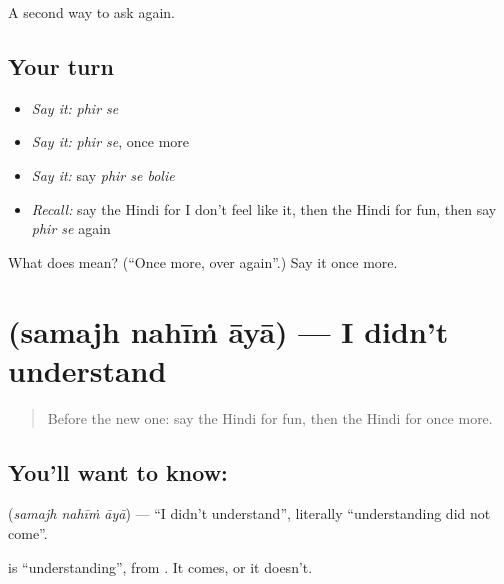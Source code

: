 \begin{grammarlens}[title={What you've built}]
A second way to ask again.
\end{grammarlens}

\subsection*{Your turn}
\begin{itemize}
\raggedright
  \item \emph{Say it:} \emph{phir se}
  \item \emph{Say it:} \emph{phir se}, once more
  \item \emph{Say it:} say \emph{phir se bolie}
  \item \emph{Recall:} say the Hindi for I don't feel like it, then the Hindi for fun, then say \emph{phir se} again
\end{itemize}

\begin{tcolorbox}[breakable,colback=teal!4,colframe=teal!35!black,title={Before you move on}]
What does   mean? (\textquotedblleft{}Once more, over again\textquotedblright{}.) Say it once more.
\end{tcolorbox}
\section[\texorpdfstring{\hi{समझ} \hi{नहीं} \hi{आया} (samajh nahīṁ āyā)}{समझ नहीं आया (samajh nahīṁ āyā)}]{   (samajh nahīṁ āyā) — I didn't understand}

\label{lesson:HI-C126-samajhnahin}



\begin{quote}
Before the new one: say the Hindi for fun, then the Hindi for once more.
\end{quote}

\subsection*{You'll want to know:   }
\textbf{  } (\emph{samajh nahīṁ āyā}) — \textquotedblleft{}I didn't understand\textquotedblright{}, literally \textquotedblleft{}understanding did not come\textquotedblright{}.

\textbf{} is \textquotedblleft{}understanding\textquotedblright{}, from \textbf{}. It comes, or it doesn't.

